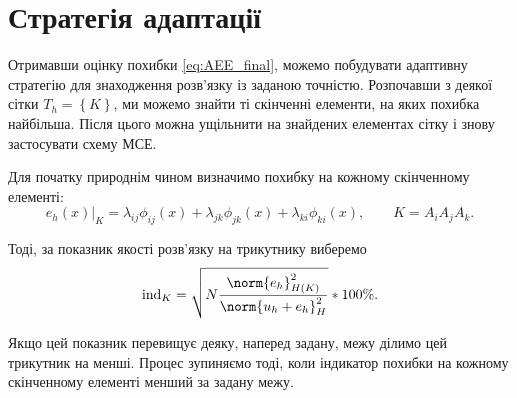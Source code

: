 
\section{Стратегія адаптації}

Отримавши оцінку похибки \eqref{eq:AEE_final}, можемо побудувати адаптивну стратегію для знаходження розв'язку із заданою точністю.
Розпочавши з деякої сітки $T_h =  \left\{ K \right\}$, ми можемо знайти ті скінченні елементи, на яких похибка найбільша.
Після цього можна ущільнити на знайдених елементах сітку і знову застосувати схему МСЕ.

Для початку природнім чином визначимо похибку на кожному скінченному елементі:
%
\newcommand{\error}[1]{\lambda_{#1} \phi_{#1}(x)}
\begin{equation}\label{eq:error_element}
	e_h(x)\bigg|_K = \error{ij}+\error{jk}+\error{ki}, \qquad K = A_iA_jA_k.
\end{equation}

Тоді, за показник якості розв'язку на трикутнику виберемо
%
\begin{equation}\label{eq:error_indicator}
	\text{ind}_K = \sqrt{N \frac
			{\norm{e_h}^2_{H(K)}}
			{\norm{u_h+e_h}^2_H}
	}*100\%.
\end{equation}

Якщо цей показник перевищує деяку, наперед задану, межу ділимо цей трикутник на менші.
Процес зупиняємо тоді, коли індикатор похибки на кожному скінченному елементі менший за задану межу.

\undeff{\error}
